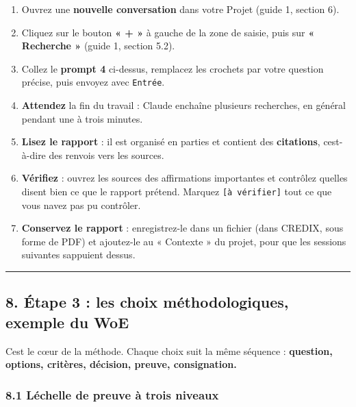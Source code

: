 \documentclass[
  french,
  11pt,
  a4paper,
]{article}
\providecommand{\tightlist}{%
  \setlength{\itemsep}{0pt}\setlength{\parskip}{0pt}}
\begin{document}
\begin{enumerate}
\def\labelenumi{\arabic{enumi}.}
\tightlist
\item
  Ouvrez une \textbf{nouvelle conversation} dans votre Projet (guide 1,
  section 6).
\item
  Cliquez sur le bouton \textbf{« + »} à gauche de la zone de saisie,
  puis sur \textbf{« Recherche »} (guide 1, section 5.2).
\item
  Collez le \textbf{prompt 4} ci-dessus, remplacez les crochets par
  votre question précise, puis envoyez avec \texttt{Entrée}.
\item
  \textbf{Attendez} la fin du travail : Claude enchaîne plusieurs
  recherches, en général pendant une à trois minutes.
\item
  \textbf{Lisez le rapport} : il est organisé en parties et contient des
  \textbf{citations}, c\textquotesingle est-à-dire des renvois vers les
  sources.
\item
  \textbf{Vérifiez} : ouvrez les sources des affirmations importantes et
  contrôlez qu\textquotesingle elles disent bien ce que le rapport
  prétend. Marquez \texttt{{[}à\ vérifier{]}} tout ce que vous
  n\textquotesingle avez pas pu contrôler.
\item
  \textbf{Conservez le rapport} : enregistrez-le dans un fichier (dans
  CREDIX, sous forme de PDF) et ajoutez-le au « Contexte » du projet,
  pour que les sessions suivantes s\textquotesingle appuient dessus.
\end{enumerate}

\begin{center}\rule{0.5\linewidth}{0.5pt}\end{center}

\subsection{8. Étape 3 : les choix méthodologiques, exemple du
WoE}\label{8-uxe9tape-3--les-choix-muxe9thodologiques-exemple-du-woe}

C\textquotesingle est le cœur de la méthode. Chaque choix suit la même
séquence : \textbf{question, options, critères, décision, preuve,
consignation.}

\subsubsection{8.1 L\textquotesingle échelle de preuve à trois
niveaux}\label{81-luxe9chelle-de-preuve-uxe0-trois-niveaux}
\end{document}
